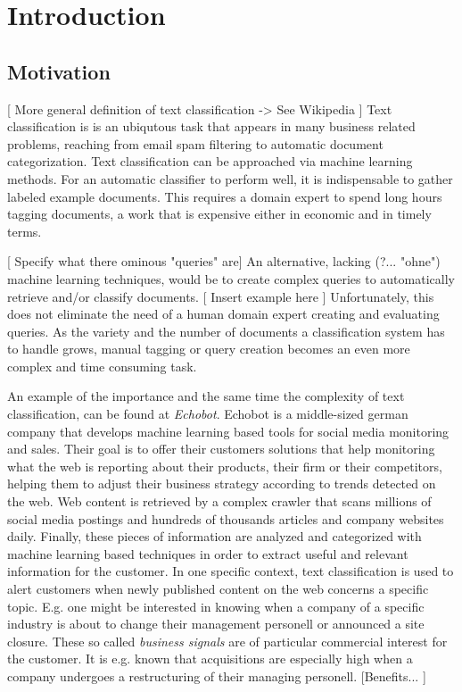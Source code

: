 
\chapter{Introduction}
\label{ch:Introduction}

\section{Motivation}
\label{sec:Motivation}
[ More general definition of text classification -> See Wikipedia ]
Text classification is is an ubiqutous task that appears in many business related problems, reaching from email spam filtering to automatic document categorization. 
Text classification can be approached via machine learning methods. For an automatic classifier to perform well, it is indispensable to gather labeled example documents. This requires a domain expert to spend long hours tagging documents, a work that is expensive either in economic and in timely terms. 

[ Specify what there ominous "queries" are]
An alternative, lacking (?... "ohne") machine learning techniques, would be to create complex queries to automatically retrieve and/or classify documents. 
[ Insert example here ]
Unfortunately, this does not eliminate the need of a human domain expert creating and evaluating queries. As the variety and the number of documents a classification system has to handle grows, manual tagging or query creation becomes an even more complex and time consuming task. 

An example of the importance and the same time the complexity of text classification, can be found at \textit{Echobot}. Echobot is a middle-sized german company that develops machine learning based tools for social media monitoring and sales. Their goal is to offer their customers solutions that help monitoring what the web is reporting about their products, their firm or their competitors, helping them to adjust their business strategy according to trends detected on the web. Web content is retrieved by a complex crawler that scans millions of social media postings and hundreds of thousands articles and company websites daily. Finally, these pieces of information are analyzed and categorized with machine learning based techniques in order to extract useful and relevant information for the customer. 
In one specific context, text classification is used to alert customers when newly published content on the web concerns a specific topic. E.g. one might be interested in knowing when a company of a specific industry is about to change their management personell or announced a site closure. These so called \textit{business signals} are of particular commercial interest for the customer. It is e.g. known that acquisitions are especially high when a company undergoes a restructuring of their managing personell. [Benefits... ]

